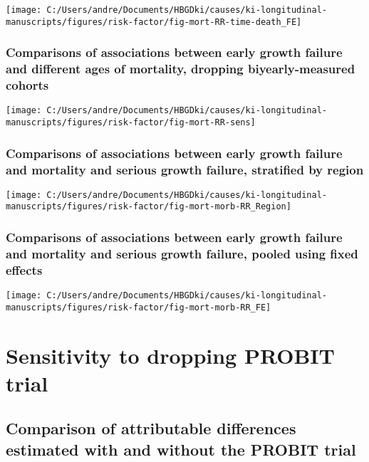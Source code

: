 \documentclass[9pt,]{book}
\begin{document}
\texttt{[image: C:/Users/andre/Documents/HBGDki/causes/ki-longitudinal-manuscripts/figures/risk-factor/fig-mort-RR-time-death\_FE]}

\subsection{Comparisons of associations between early growth failure and
different ages of mortality, dropping biyearly-measured
cohorts}\label{comparisons-of-associations-between-early-growth-failure-and-different-ages-of-mortality-dropping-biyearly-measured-cohorts}

\texttt{[image: C:/Users/andre/Documents/HBGDki/causes/ki-longitudinal-manuscripts/figures/risk-factor/fig-mort-RR-sens]}

\subsection{Comparisons of associations between early growth failure and
mortality and serious growth failure, stratified by
region}\label{comparisons-of-associations-between-early-growth-failure-and-mortality-and-serious-growth-failure-stratified-by-region}

\texttt{[image: C:/Users/andre/Documents/HBGDki/causes/ki-longitudinal-manuscripts/figures/risk-factor/fig-mort-morb-RR\_Region]}

\subsection{Comparisons of associations between early growth failure and
mortality and serious growth failure, pooled using fixed
effects}\label{comparisons-of-associations-between-early-growth-failure-and-mortality-and-serious-growth-failure-pooled-using-fixed-effects}

\texttt{[image: C:/Users/andre/Documents/HBGDki/causes/ki-longitudinal-manuscripts/figures/risk-factor/fig-mort-morb-RR\_FE]}

\chapter{Sensitivity to dropping PROBIT trial}\label{no-PROBIT}

\raggedright

\section{Comparison of attributable differences estimated with and
without the PROBIT
trial}\label{comparison-of-attributable-differences-estimated-with-and-without-the-probit-trial}
\end{document}
